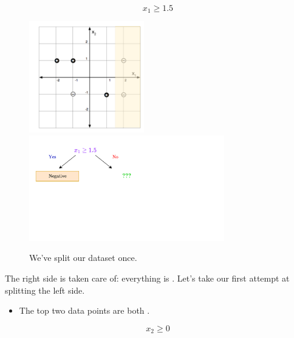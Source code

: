          \begin{equation}
             x_1 \geq 1.5
         \end{equation}

         \begin{figure}[H]
            \centering
            \includegraphics[width=50mm,scale=0.5]{images/nonparametric_images/x1_geq_1_5.png}
            \includegraphics[width=85mm,scale=0.5]{images/nonparametric_images/x1_geq_1_5_tree.png}
            \caption*{We've split our dataset once.}
        \end{figure}

        The right side is taken care of: everything is . Let's take our first attempt at splitting the left side.

        \begin{itemize}
            \item The top two data points are both .
        \end{itemize}

        \begin{equation}
             x_2 \geq 0
         \end{equation}

